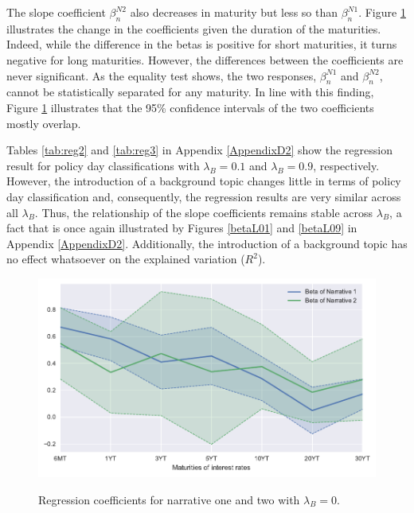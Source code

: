 \documentclass[11pt,a4paper,english,oneside]{book}
\numberwithin{equation}{chapter}
\begin{document}
The slope coefficient $\beta_n^{N2}$ also decreases in maturity but less so than $\beta_n^{N1}$. Figure \ref{betaL00} illustrates the change in the coefficients given the duration of the maturities. Indeed, while the difference in the betas is positive for short maturities, it turns negative for long maturities. %
However, the differences between the coefficients are never significant. As the equality test shows, the two responses, $\beta_n^{N1}$ and $\beta_n^{N2}$, cannot be statistically separated for any maturity. In line with this finding, Figure \ref{betaL00} illustrates that the 95\% confidence intervals of the two coefficients mostly overlap. 

Tables \ref{tab:reg2} and \ref{tab:reg3} in Appendix \ref{AppendixD2} show the regression result for policy day classifications with $\lambda_B=0.1$ and $\lambda_B=0.9$, respectively. However, the introduction of a background topic changes little in terms of policy day classification and, consequently, the regression results are very similar across all $\lambda_B$. Thus, the relationship of the slope coefficients remains stable across $\lambda_B$, a fact that is once again illustrated by Figures \ref{betaL01} and \ref{betaL09} in Appendix \ref{AppendixD2}. Additionally, the introduction of a background topic has no effect whatsoever on the explained variation ($R^2$).

\begin{figure}
	\caption{Regression coefficients for narrative one and two with $\lambda_B=0$.}
	\centering
	\includegraphics[scale=1]{Images/betasLamb0_0.pdf}
	\label{betaL00}
\end{figure}
\end{document}
